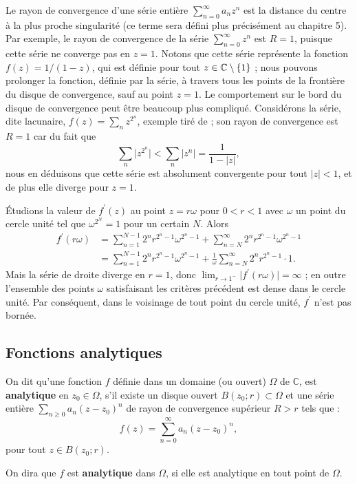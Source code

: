 \begin{rem}
Le rayon de convergence d'une série entière $\sum_{n=0}^\infty a_n z ^n$ est la distance du centre à la plus proche singularité (ce terme sera défini plus précisément au chapitre 5). Par exemple, le rayon de convergence de la série
$\sum_{n=0}^\infty z^n$ est $R=1$, puisque cette série ne converge pas en $z=1$. Notons que cette série représente la fonction $f(z)=1/(1-z)$, qui est définie pour tout $z \in \mathbb{C} \setminus \{1\}$ ; nous pouvons prolonger la fonction, définie par la série, à travers tous les points de la frontière du disque de convergence, sauf au point $z=1$. Le comportement sur le bord du disque de convergence peut être beaucoup plus compliqué. Considérons la série, dite lacunaire, $f(z)=\sum_n z^{2^n}$, exemple tiré de \cite{greene2006function} ; son rayon de convergence est $R=1$ car du fait que
\[\sum_n \lvert z^{2^n} \rvert < \sum_n \lvert z^{n} \rvert = \frac{1}{1-\lvert z \rvert},\]
nous en déduisons que cette série est absolument convergente pour tout $\lvert z \rvert <1$, et de plus elle diverge pour $z=1$.

Étudions la valeur de $f^\prime(z)$ au point $z=r \omega$ pour $0< r <1$ avec $\omega$ un point du cercle unité tel que $\omega^{2^N}=1$ pour un certain $N$. Alors
\begin{align*}
f^\prime(r \omega)&=\sum_{n=1}^{N-1} 2^n r^{2^n-1} \omega^{2^n-1} + \sum_{n=N}^{\infty} 2^n r^{2^n-1} \omega^{2^n-1} \\
&=\sum_{n=1}^{N-1} 2^n r^{2^n-1} \omega^{2^n-1} + \frac{1}{\omega}\sum_{n=N}^{\infty} 2^n r^{2^n-1} \cdot 1.
\end{align*}
Mais la série de droite diverge en $r=1$, donc $\lim_{r \to 1^-} \lvert f^\prime(r \omega) \rvert=\infty$ ; en outre l'ensemble des points $\omega$ satisfaisant les critères précédent est dense dans le cercle unité. Par conséquent, dans le voisinage de tout point du cercle unité, $f^\prime$ n'est pas bornée.

\end{rem}





\subsection{Fonctions analytiques}

\begin{fdefn}
On dit qu'une fonction $f$ définie dans un domaine (ou ouvert) $\Omega$ de $\mathbb{C}$, est \textbf{analytique} en $z_0 \in \Omega$, s'il existe un disque ouvert $B(z_0 ; r) \subset \Omega$ et une série entière
$\sum_{n \geq 0}a_n (z -z_0)^n$ de rayon de convergence supérieur $R>r$ tels que :
\[f(z) = \sum_{n =0}^\infty a_n(z-z_0)^n,\]
pour tout $z \in B(z_0 ; r)$. 

On dira que $f$ est \textbf{analytique} dans $\Omega$, si elle est analytique en tout
point de $\Omega$.
\end{fdefn}

